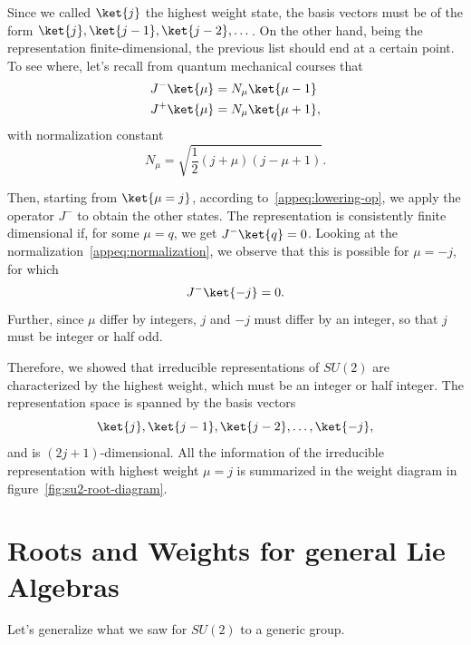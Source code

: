 Since we called $\ket{j}$ the highest weight state, the basis vectors must be of the form $\ket{j}, \ket{j-1}, \ket{j-2}, \dots$. On the other hand, being the representation finite-dimensional, the previous list should end at a certain point. To see where, let's recall from quantum mechanical courses that
\begin{equation}
\begin{aligned}
    J^- \ket{\mu} &= N_\mu \ket{\mu - 1} \label{appeq:lowering-op}\\
    J^+ \ket{\mu} &= N_\mu \ket{\mu +1},
\end{aligned}
\end{equation}
with normalization constant
\begin{equation}\label{appeq:normalization}
    N_\mu = \sqrt{\frac{1}{2}(j+\mu)(j-\mu+1)} .
\end{equation}

Then, starting from $\ket{\mu = j}$, according to~\eqref{appeq:lowering-op}, we apply the operator $J^-$ to obtain the other states. The representation is consistently finite dimensional if, for some $\mu = q$, we get $J^- \ket{q} = 0$. Looking at the normalization~\eqref{appeq:normalization}, we observe that this is possible for $\mu = -j$, for which
\begin{equation}
    J^-\ket{-j} = 0.
\end{equation}
Further, since $\mu$ differ by integers, $j$ and $-j$ must differ by an integer, so that $j$ must be integer or half odd.

Therefore, we showed that irreducible representations of $SU(2)$ are characterized by the highest weight, which must be an integer or half integer. The representation space is spanned by the basis vectors
\begin{equation}
    \ket{j}, \ket{j-1}, \ket{j-2}, \dots, \ket{-j},
\end{equation}
and is $(2j+1)$-dimensional. All the information of the irreducible representation with highest weight $\mu=j$ is summarized in the weight diagram in figure~\ref{fig:su2-root-diagram}.

\section{Roots and Weights for general Lie Algebras}
Let's generalize what we saw for $SU(2)$ to a generic group.

